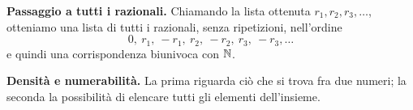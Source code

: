 \textbf{Passaggio a tutti i razionali.} Chiamando la lista ottenuta $r_1,r_2,r_3,\ldots$, otteniamo una lista di tutti i razionali, senza ripetizioni, nell'ordine
\[
  0,\ r_1,\ -r_1,\ r_2,\ -r_2,\ r_3,\ -r_3,\ldots
\]
e quindi una corrispondenza biunivoca con $\mathbb{N}$.

\textbf{Densità e numerabilità.} La prima riguarda ciò che si trova fra due numeri; la seconda la possibilità di elencare tutti gli elementi dell'insieme.




